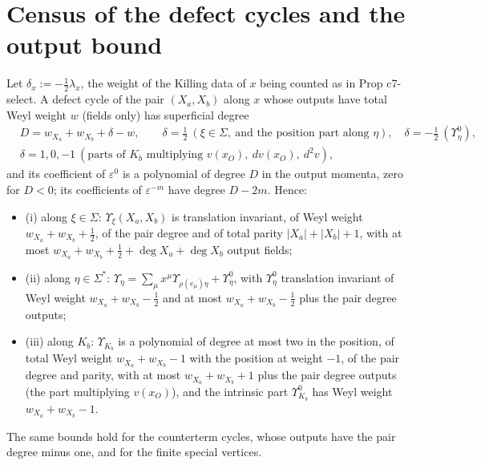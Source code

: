 \section{Census of the defect cycles and the output bound}
\label{sec:qs-census}

\begin{proposition}
\label{prop:qs-bound}
Let $\delta_x:=-\tfrac12\lambda_x$, the weight of the Killing data of $x$ being counted as in Prop c7-select. A defect cycle of the pair $(X_a,X_b)$ along $x$ whose outputs have total Weyl weight $w$ (fields only) has superficial degree
\[
\begin{aligned}
&D=w_{X_a}+w_{X_b}+\delta-w,\qquad \delta=\tfrac12\ (\xi\in\Sigma,\ \text{and the position part along }\eta),\quad \delta=-\tfrac12\ (\Upsilon^0_\eta),\\
&\delta=1,0,-1\ (\text{parts of }K_b\text{ multiplying }v(x_O),\ dv(x_O),\ d^2v),
\end{aligned}
\]
and its coefficient of $\varepsilon^0$ is a polynomial of degree $D$ in the output momenta, zero for $D<0$; its coefficients of $\varepsilon^{-m}$ have degree $D-2m$. Hence:
\begin{itemize}
\item (i) along $\xi\in\Sigma$: $\Upsilon_\xi(X_a,X_b)$ is translation invariant, of Weyl weight $w_{X_a}+w_{X_b}+\tfrac12$, of the pair degree and of total parity $|X_a|+|X_b|+1$, with at most $w_{X_a}+w_{X_b}+\tfrac12+\deg X_a+\deg X_b$ output fields;
\item (ii) along $\eta\in\Sigma^*$: $\Upsilon_\eta=\sum_\mu x^\mu\Upsilon_{\rho(e_\mu)\eta}+\Upsilon^0_\eta$, with $\Upsilon^0_\eta$ translation invariant of Weyl weight $w_{X_a}+w_{X_b}-\tfrac12$ and at most $w_{X_a}+w_{X_b}-\tfrac12$ plus the pair degree outputs;
\item (iii) along $K_b$: $\Upsilon_{K_b}$ is a polynomial of degree at most two in the position, of total Weyl weight $w_{X_a}+w_{X_b}-1$ with the position at weight $-1$, of the pair degree and parity, with at most $w_{X_a}+w_{X_b}+1$ plus the pair degree outputs (the part multiplying $v(x_O)$), and the intrinsic part $\Upsilon^0_{K_b}$ has Weyl weight $w_{X_a}+w_{X_b}-1$.
\end{itemize}
The same bounds hold for the counterterm cycles, whose outputs have the pair degree minus one, and for the finite special vertices.
\end{proposition}


